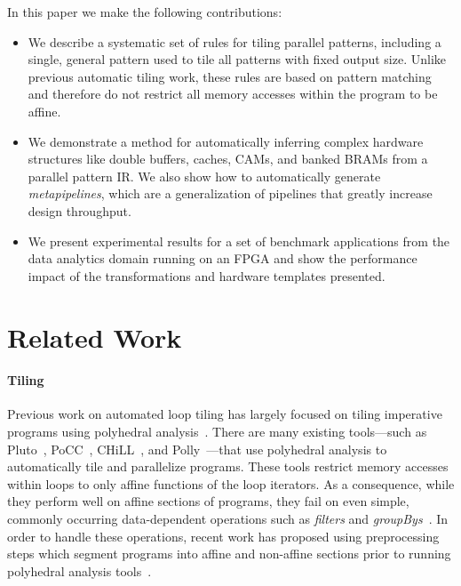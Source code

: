 \documentclass[pageno]{jpaper}
\begin{document}
In this paper we make the following contributions:
\begin{itemize}
  \item We describe a systematic set of rules for tiling parallel patterns, including a single, general pattern used to tile all patterns with fixed output size.
  Unlike previous automatic tiling work, these rules are based on pattern matching and therefore do not restrict all memory accesses within the program to be affine.


\item We demonstrate a method for automatically inferring complex hardware structures like double buffers, caches, CAMs, and banked BRAMs from a parallel pattern IR.
  We also show how to automatically generate \emph{metapipelines}, which are a generalization of pipelines that greatly increase design throughput.

  \item
  We present experimental results for a set of benchmark applications from the data analytics domain running on an FPGA and show the performance impact of
  the transformations and hardware templates presented.
\end{itemize}

 \section{Related Work}
\paragraph{Tiling}
Previous work on automated loop tiling has largely focused on tiling imperative programs
using polyhedral analysis~\cite{bondhugula08,pouchet10phd}.
There are many existing tools---such as Pluto~\cite{pluto08pldi},
PoCC~\cite{pouchet11popl}, CHiLL~\cite{chen2008chill},
and Polly~\cite{grosser2012polly}---that use polyhedral analysis
to automatically tile and parallelize programs.  These tools restrict memory
accesses within loops to only affine functions of the loop iterators.
As a consequence, while they perform well on affine sections of programs,
they fail on even simple, commonly occurring data-dependent operations
such as \emph{filters} and \emph{groupBys}~\cite{benabderrahmane10cc}. In order to handle these operations,
recent work has proposed using preprocessing steps which segment programs into affine
and non-affine sections prior to running polyhedral analysis tools~\cite{venkat}.
\end{document}
